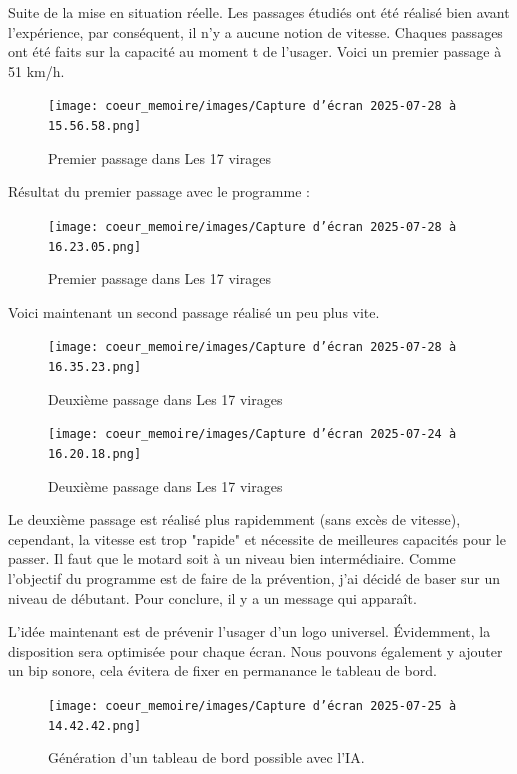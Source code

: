




Suite de la mise en situation réelle. Les passages étudiés ont été réalisé bien avant l'expérience, par conséquent, il n'y a aucune notion de vitesse. Chaques passages ont été faits sur la capacité au moment t de l'usager. Voici un premier passage à 51 km/h.
\begin{figure}[H]
    \centering
    \texttt{[image: coeur\_memoire/images/Capture d’écran 2025-07-28 à 15.56.58.png]} 
    \caption{Premier passage dans Les 17 virages}
\end{figure}

Résultat du premier passage avec le programme :
\begin{figure}[H]
    \centering
    \texttt{[image: coeur\_memoire/images/Capture d’écran 2025-07-28 à 16.23.05.png]} 
    \caption{Premier passage dans Les 17 virages}
\end{figure}

Voici maintenant un second passage réalisé un peu plus vite.
\begin{figure}[H]
    \centering
    \texttt{[image: coeur\_memoire/images/Capture d’écran 2025-07-28 à 16.35.23.png]} 
    \caption{Deuxième passage dans Les 17 virages}
\end{figure}


\begin{figure}[H]
    \centering
    \texttt{[image: coeur\_memoire/images/Capture d’écran 2025-07-24 à 16.20.18.png]} 
    \caption{Deuxième passage dans Les 17 virages}
\end{figure}

Le deuxième passage est réalisé plus rapidemment (sans excès de vitesse), cependant, la vitesse est trop "rapide" et nécessite de meilleures capacités pour le passer. Il faut que le motard soit à un niveau bien intermédiaire. Comme l'objectif du programme est de faire de la prévention, j'ai décidé de baser sur un niveau de débutant. Pour conclure, il y a un message qui apparaît.

L'idée maintenant est de prévenir l'usager d'un logo universel. Évidemment, la disposition sera optimisée pour chaque écran. Nous pouvons également y ajouter un bip sonore, cela évitera de fixer en permanance le tableau de bord.
\begin{figure}[H]
    \centering
    \texttt{[image: coeur\_memoire/images/Capture d’écran 2025-07-25 à 14.42.42.png]} 
    \caption{Génération d'un tableau de bord possible avec l'IA.}
\end{figure}

